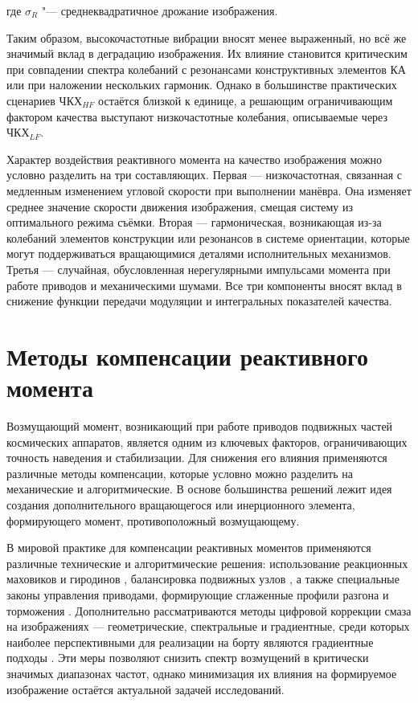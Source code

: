 \noindent где \(\sigma_R\) "--- среднеквадратичное дрожание изображения.


Таким образом, высокочастотные вибрации вносят менее выраженный, но всё же значимый вклад в деградацию изображения. Их влияние становится критическим при совпадении спектра колебаний с резонансами конструктивных элементов КА или при наложении нескольких гармоник. Однако в большинстве практических сценариев $\text{ЧКХ}_{HF}$ остаётся близкой к единице, а решающим ограничивающим фактором качества выступают низкочастотные колебания, описываемые через $\text{ЧКХ}_{LF}$.

Характер воздействия реактивного момента на качество изображения можно условно разделить на три составляющих. Первая — низкочастотная, связанная с медленным изменением угловой скорости при выполнении манёвра. Она изменяет среднее значение скорости движения изображения, смещая систему из оптимального режима съёмки. Вторая — гармоническая, возникающая из-за колебаний элементов конструкции или резонансов в системе ориентации, которые могут поддерживаться вращающимися деталями исполнительных механизмов. Третья — случайная, обусловленная нерегулярными импульсами момента при работе приводов и механическими шумами. Все три компоненты вносят вклад в снижение функции передачи модуляции и интегральных показателей качества.

\section{Методы компенсации реактивного момента}
Возмущающий момент, возникающий при работе приводов подвижных частей космических аппаратов, является одним из ключевых факторов, ограничивающих точность наведения и стабилизации. Для снижения его влияния применяются различные методы компенсации, которые условно можно разделить на механические и алгоритмические. В основе большинства решений лежит идея создания дополнительного вращающегося или инерционного элемента, формирующего момент, противоположный возмущающему.

В мировой практике для компенсации реактивных моментов применяются различные технические и алгоритмические решения: использование реакционных маховиков и гиродинов \cite{pittelkau2012pointing, dennehy2021spacecraft}, балансировка подвижных узлов \cite{alvarez2018spacecraft}, а также специальные законы управления приводами, формирующие сглаженные профили разгона и торможения \cite{lappas2002attitude, zhao2023effect}. Дополнительно рассматриваются методы цифровой коррекции смаза на изображениях — геометрические, спектральные и градиентные, среди которых наиболее перспективными для реализации на борту являются градиентные подходы \cite{volobuev2021dissertation}. Эти меры позволяют снизить спектр возмущений в критически значимых диапазонах частот, однако минимизация их влияния на формируемое изображение остаётся актуальной задачей исследований.

